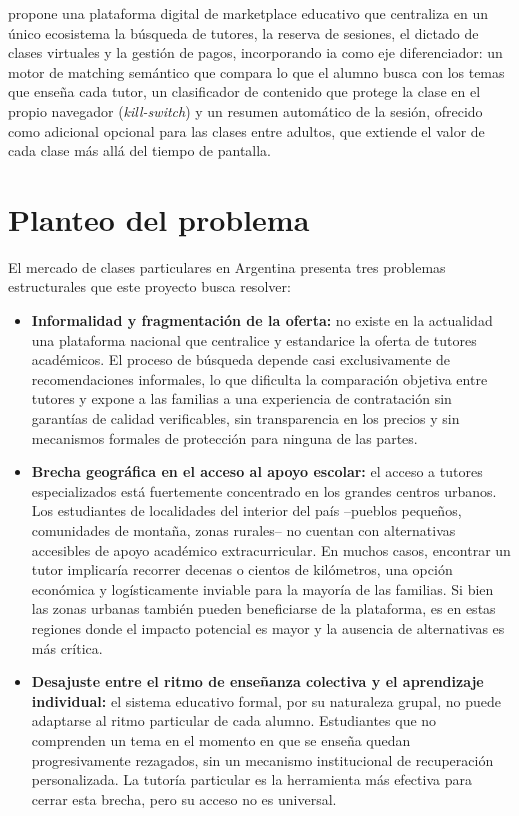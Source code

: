 \sistema{} propone una plataforma digital de \gls{marketplace} educativo
que centraliza en un único ecosistema la búsqueda de tutores, la
reserva de sesiones, el dictado de clases virtuales y la gestión de
pagos, incorporando \gls{ia} como eje diferenciador: un motor de
\gls{matching} semántico que compara lo que el alumno busca con los
temas que enseña cada tutor, un clasificador de contenido que protege
la clase en el propio navegador (\emph{kill-switch}) y un resumen
automático de la sesión, ofrecido como adicional opcional para las
clases entre adultos, que extiende el valor de cada clase más allá del
tiempo de pantalla.

\section{Planteo del problema}\label{sec:problema}

El mercado de clases particulares en Argentina presenta tres problemas
estructurales que este proyecto busca resolver:

\begin{itemize}
    \item \textbf{Informalidad y fragmentación de la oferta:} no existe en
          la actualidad una plataforma nacional que centralice y
          estandarice la oferta de tutores académicos. El proceso de
          búsqueda depende casi exclusivamente de recomendaciones
          informales, lo que dificulta la comparación objetiva entre
          tutores y expone a las familias a una experiencia de
          contratación sin garantías de calidad verificables, sin
          transparencia en los precios y sin mecanismos formales de
          protección para ninguna de las partes.
    \item \textbf{Brecha geográfica en el acceso al apoyo escolar:} el
          acceso a tutores especializados está fuertemente concentrado en
          los grandes centros urbanos. Los estudiantes de localidades del
          interior del país --pueblos pequeños, comunidades de montaña,
          zonas rurales-- no cuentan con alternativas accesibles de apoyo
          académico extracurricular. En muchos casos, encontrar un tutor
          implicaría recorrer decenas o cientos de kilómetros, una opción
          económica y logísticamente inviable para la mayoría de las
          familias. Si bien las zonas urbanas también pueden beneficiarse
          de la plataforma, es en estas regiones donde el impacto
          potencial es mayor y la ausencia de alternativas es más
          crítica.
    \item \textbf{Desajuste entre el ritmo de enseñanza colectiva y el
          aprendizaje individual:} el sistema educativo formal, por su
          naturaleza grupal, no puede adaptarse al ritmo particular de
          cada alumno. Estudiantes que no comprenden un tema en el
          momento en que se enseña quedan progresivamente rezagados, sin
          un mecanismo institucional de recuperación personalizada. La
          tutoría particular es la herramienta más efectiva para cerrar
          esta brecha, pero su acceso no es universal.
\end{itemize}

